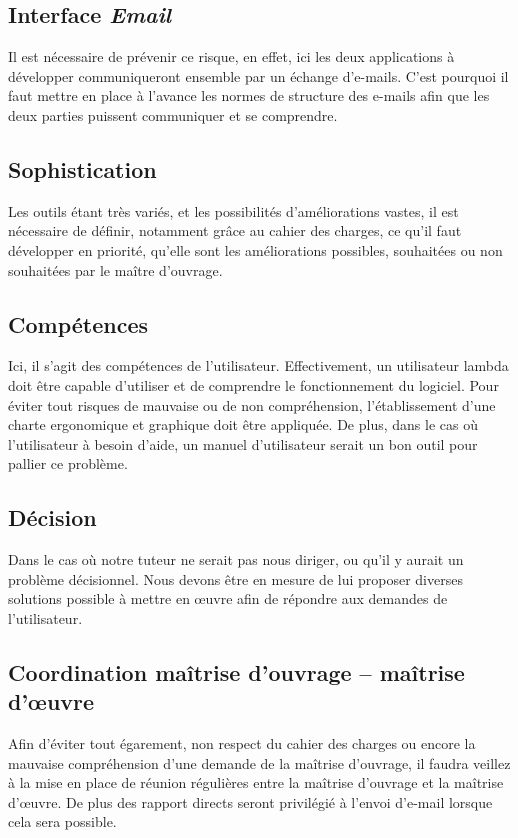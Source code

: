 \documentclass[etudiants]{support-iutrs}
\begin{document}
\subsection{Interface \emph{Email}}

Il est nécessaire de prévenir ce risque, en effet, ici les deux applications à développer communiqueront ensemble par un échange d'e-mails. C'est pourquoi il faut mettre en place à l'avance les normes de structure des e-mails afin que les deux parties  puissent communiquer et se comprendre.

\subsection{Sophistication}

Les outils étant très variés, et les possibilités d'améliorations vastes, il est nécessaire de définir, notamment grâce au cahier des charges, ce qu'il faut développer en priorité, qu'elle sont les améliorations possibles, souhaitées ou non souhaitées par le maître d'ouvrage.

\subsection{Compétences}

Ici, il s'agit des compétences de l'utilisateur. Effectivement, un utilisateur lambda doit être capable d'utiliser et de comprendre le fonctionnement du logiciel. Pour éviter tout risques de mauvaise ou de non compréhension, l'établissement d'une charte ergonomique et graphique doit être appliquée. De plus, dans le cas où l'utilisateur à besoin d'aide, un manuel d'utilisateur serait un bon outil pour pallier ce problème.

\subsection{Décision}

Dans le cas où notre tuteur ne serait pas nous diriger, ou qu'il y aurait un problème décisionnel. Nous devons être en mesure de lui proposer diverses solutions possible à mettre en œuvre afin de répondre aux demandes de l'utilisateur. 


\subsection{Coordination maîtrise d'ouvrage – maîtrise d’œuvre}

Afin d'éviter tout égarement, non respect du cahier des charges ou encore la mauvaise compréhension d'une demande de la maîtrise d'ouvrage, il faudra veillez à la mise en place de réunion régulières entre la maîtrise d'ouvrage et la maîtrise d’œuvre. 
De plus des rapport directs seront privilégié à l'envoi d'e-mail lorsque cela sera possible.    
\end{document}
